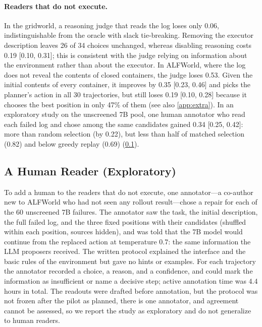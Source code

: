 \documentclass{article}
\theoremstyle{plain}
\theoremstyle{definition}
\theoremstyle{remark}
\begin{document}
\paragraph{Readers that do not execute.}
In the gridworld, a reasoning judge that reads the log loses only 0.06, indistinguishable from the oracle with slack tie-breaking. Removing the executor description leaves 26 of 34 choices unchanged, whereas disabling reasoning costs 0.19 [0.10, 0.31]; this is consistent with the judge relying on information about the environment rather than about the executor. In ALFWorld, where the log does not reveal the contents of closed containers, the judge loses 0.53. Given the initial contents of every container, it improves by 0.35 [0.23, 0.46] and picks the planner's action in all 30 trajectories, but still loses 0.19 [0.10, 0.28] because it chooses the best position in only 47\% of them (see also \cref{app:extra}). In an exploratory study on the unscreened 7B pool, one human annotator who read each failed log and chose among the same candidates gained 0.34 [0.25, 0.42]: more than random selection (by 0.22), but less than half of matched selection (0.82) and below greedy replay (0.69) (\cref{app:human}).

\subsection{A Human Reader (Exploratory)}
\label{app:human}

To add a human to the readers that do not execute, one annotator---a co-author new to ALFWorld who had not seen any rollout result---chose a repair for each of the 60 unscreened 7B failures. The annotator saw the task, the initial description, the full failed log, and the three fixed positions with their candidates (shuffled within each position, sources hidden), and was told that the 7B model would continue from the replaced action at temperature 0.7: the same information the LLM proposers received. The written protocol explained the interface and the basic rules of the environment but gave no hints or examples. For each trajectory the annotator recorded a choice, a reason, and a confidence, and could mark the information as insufficient or name a decisive step; active annotation time was 4.4 hours in total. The readouts were drafted before annotation, but the protocol was not frozen after the pilot as planned, there is one annotator, and agreement cannot be assessed, so we report the study as exploratory and do not generalize to human readers.
\end{document}
